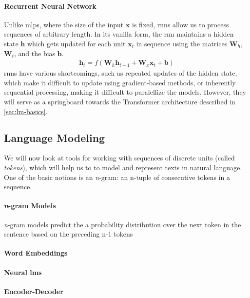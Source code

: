 \paragraph{Recurrent Neural Network} Unlike \acp{mlp}, where the size of the input $\mathbf{x}$ is fixed, \acp{rnn} allow us to process sequences of arbitrary length. In its vanilla form, the \ac{rnn} maintains a hidden state $\mathbf{h}$ which gets updated for each unit $\mathbf{x}_t$ in sequence using the matrices $\mathbf{W}_h$, $\mathbf{W}_t$, and the bias $\mathbf{b}$.
\begin{align}
    \mathbf{h}_t = f(\mathbf{W}_h \mathbf{h}_{t-1} + \mathbf{W}_x \mathbf{x}_t + \mathbf{b})
\end{align}
\acp{rnn} have various shortcomings, such as repeated updates of the hidden state, which make it difficult to update using gradient-based methods, or inherently sequential processing, making it difficult to paralellize the models. However, they will serve as a springboard towards the Transformer architecture described in \autoref{sec:lm-basics}.


\subsection{Language Modeling}
\label{sec:lm-basics}
We will now look at tools for working with sequences of discrete units (called \textit{tokens}), which will help us to to model and represent texts in natural language. One of the basic notions is an \emph{n}-gram: an n-tuple of consecutive tokens in a sequence.

\paragraph{\emph{n}-gram Models} \emph{n}-gram models predict the a probability distribution over the next token in the sentence
based on the preceding n-1 tokens

\paragraph{Word Embeddings}

\paragraph{Neural \acp{lm}}

\paragraph{Encoder-Decoder}

